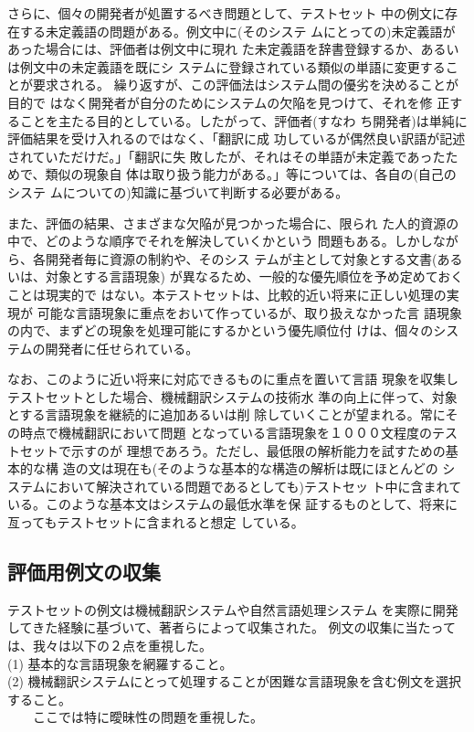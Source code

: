 さらに、個々の開発者が処置するべき問題として、テストセット
中の例文に存在する未定義語の問題がある。例文中に(そのシステ
ムにとっての)未定義語があった場合には、評価者は例文中に現れ
た未定義語を辞書登録するか、あるいは例文中の未定義語を既にシ
ステムに登録されている類似の単語に変更することが要求される。
繰り返すが、この評価法はシステム間の優劣を決めることが目的で
はなく開発者が自分のためにシステムの欠陥を見つけて、それを修
正することを主たる目的としている。したがって、評価者(すなわ
ち開発者)は単純に評価結果を受け入れるのではなく、「翻訳に成
功しているが偶然良い訳語が記述されていただけだ。」「翻訳に失
敗したが、それはその単語が未定義であったためで、類似の現象自
体は取り扱う能力がある。」等については、各自の(自己のシステ
ムについての)知識に基づいて判断する必要がある。

また、評価の結果、さまざまな欠陥が見つかった場合に、限られ
た人的資源の中で、どのような順序でそれを解決していくかという
問題もある。しかしながら、各開発者毎に資源の制約や、そのシス
テムが主として対象とする文書(あるいは、対象とする言語現象)
が異なるため、一般的な優先順位を予め定めておくことは現実的で
はない。本テストセットは、比較的近い将来に正しい処理の実現が
可能な言語現象に重点をおいて作っているが、取り扱えなかった言
語現象の内で、まずどの現象を処理可能にするかという優先順位付
けは、個々のシステムの開発者に任せられている。

なお、このように近い将来に対応できるものに重点を置いて言語
現象を収集しテストセットとした場合、機械翻訳システムの技術水
準の向上に伴って、対象とする言語現象を継続的に追加あるいは削
除していくことが望まれる。常にその時点で機械翻訳において問題
となっている言語現象を１０００文程度のテストセットで示すのが
理想であろう。ただし、最低限の解析能力を試すための基本的な構
造の文は現在も(そのような基本的な構造の解析は既にほとんどの
システムにおいて解決されている問題であるとしても)テストセッ
ト中に含まれている。このような基本文はシステムの最低水準を保
証するものとして、将来に亙ってもテストセットに含まれると想定
している。

\subsection{評価用例文の収集}

テストセットの例文は機械翻訳システムや自然言語処理システム
を実際に開発してきた経験に基づいて、著者らによって収集された。
例文の収集に当たっては、我々は以下の２点を重視した。\\


\noindent(1) 基本的な言語現象を網羅すること。\\
\noindent(2) 機械翻訳システムにとって処理することが困難な言語現象を含む例文を選択すること。\\
　　ここでは特に曖昧性の問題を重視した。\\


